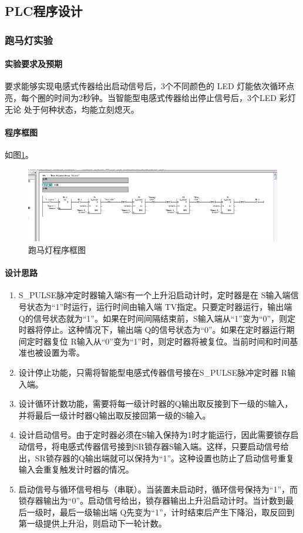 \subsection{PLC程序设计}
\subsubsection{跑马灯实验}
\paragraph{实验要求及预期} 要求能够实现电感式传器给出启动信号后，3个不同颜色的 LED 灯能依次循环点亮，每个圈的时间为2秒钟。当智能型电感式传器给出停止信号后，3个LED 彩灯无论 处于何种状态，均能立刻熄灭。

\paragraph{程序框图} 如图\ref{fig:horse}。

\begin{figure}[htbp]
\centering
\includegraphics[width=16cm]{resource/program_horse.png}
\caption{跑马灯程序框图}
\label{fig:horse}
\end{figure}

\paragraph{设计思路}
\begin{enumerate}
\item {\ttfamily S\_PULSE}脉冲定时器输入端S有一个上升沿启动计时，定时器是在 S输入端信号状态为“1”时运行，运行时间由输入端 TV指定。只要定时器运行，输出端 Q的信号状态就为“1”。如果在时间间隔结束前，S输入端从“1”变为“0”，则定时器将停止。这种情况下，输出端 Q的信号状态为“0”。如果在定时器运行期间定时器复位 R输入从“0”变为“1”时，则定时器将被复位。当前时间和时间基准也被设置为零。
\item 设计停止功能，只需将智能型电感式传器信号接在{\ttfamily S\_PULSE}脉冲定时器 R输入端。
\item 设计循环计数功能，需要将每一级计时器的Q输出取反接到下一级的S输入，并将最后一级计时器Q输出取反接回第一级的S输入。
\item 设计启动信号。由于定时器必须在S输入保持为1时才能运行，因此需要锁存启动信号，将电感式传器信号接到SR锁存器S输入端。这样，只要启动信号给出，SR锁存器的Q输出端就可以保持为“1”。这种设置也防止了启动信号重复输入会重复触发计时器的情况。
\item 启动信号与循环信号相与（串联）。当装置未启动时，循环信号保持为“1”，而锁存器输出为“0”。启动信号给出，锁存器输出上升沿启动计时。当计数到最后一级时，最后一级输出端 Q先变为“1”，计时结束后产生下降沿，取反回到第一级提供上升沿，则启动下一轮计数。
\end{enumerate}

